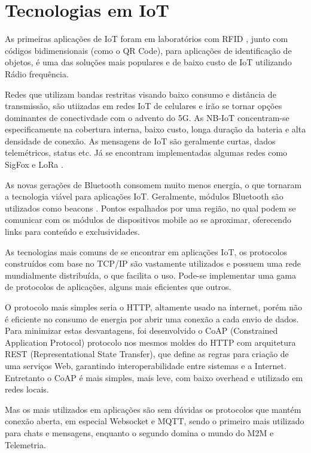 \section{Tecnologias em IoT}
\label{section:tecnologias_iot}

As primeiras aplicações de IoT foram em laboratórios com RFID \cite{Rampim:iot}, junto com códigos bidimensionais (como o QR Code), para aplicações de identificação de objetos, é uma das soluções mais populares e de baixo custo de IoT utilizando Rádio frequência.

Redes que utilizam bandas restritas visando baixo consumo e distância de transmissão, são utiizadas em redes IoT de celulares e irão se tornar opções dominantes de conectivdade com o advento do 5G. As NB-IoT concentram-se especificamente na cobertura interna, baixo custo, longa duração da bateria e alta densidade de conexão. As mensagens de IoT são geralmente curtas, dados telemétricos, status etc. Já se encontram implementadas algumas redes como SigFox \cite{Sigfox} e LoRa \cite{LoRa}. 

As novas gerações de Bluetooth consomem muito menos energia, o que tornaram a tecnologia viável para aplicações IoT. Geralmente, módulos Bluetooth são utilizados como beacons \cite{Endeavor:Beacons}. Pontos espalhados por uma região, no qual podem se comunicar com os módulos de dispositivos mobile ao se aproximar, oferecendo links para conteúdo e exclusividades.

As tecnologias mais comuns de se encontrar em aplicações IoT, os protocolos construídos com base no TCP/IP são vastamente utilizados e possuem uma rede mundialmente distribuída, o que facilita o uso. Pode-se implementar uma gama de protocolos de aplicações, alguns mais eficientes que outros.

O protocolo mais simples seria o HTTP, altamente usado na internet, porém não é eficiente no consumo de energia por abrir uma conexão a cada envio de dados. Para minimizar estas desvantagens, foi desenvolvido o CoAP (Constrained Application Protocol) \cite{coap} protocolo nos mesmos moldes do HTTP com arquitetura REST (Representational State Transfer), que define as regras para criação de uma serviços Web, garantindo interoperabilidade entre sistemas e a Internet. Entretanto o CoAP é mais simples, mais leve, com baixo overhead e utilizado em redes locais.

Mas os mais utilizados em aplicações são sem dúvidas os protocolos que mantém conexão aberta, em especial Websocket e MQTT, sendo o primeiro mais utilizado para chats e mensagens, enquanto o segundo domina o mundo do M2M e Telemetria.







